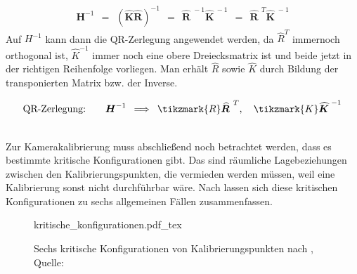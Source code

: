 \begin{align*}
	\boldsymbol{H}^{-1}
	{\:\:}={\:\:}
	(\boldsymbol{\widehat{K}}\boldsymbol{\widehat{R}})^{-1}
	{\:\:}={\:\:}
	\boldsymbol{\widehat{R}}^{\mspace{6mu}-1}\boldsymbol{\widehat{K}}^{\mspace{4mu}-1}
	{\:\:}={\:\:}
	\boldsymbol{\widehat{R}}^{\mspace{8mu}T} \boldsymbol{\widehat{K}}^{\mspace{5mu}-1}
\end{align*}
Auf $H^{-1}$ kann dann die QR-Zerlegung angewendet werden, da $\widehat{R}^T$ immernoch orthogonal ist, $\widehat{K}^{-1}$ immer noch eine obere Dreiecksmatrix ist und beide jetzt in der richtigen Reihenfolge vorliegen. Man erhält $\widehat{R}$ sowie $\widehat{K}$ durch Bildung der transponierten Matrix bzw. der Inverse.
\begin{samepage} %
\begin{align*}
	\text{QR-Zerlegung:}\qquad \boldsymbol{H}^{-1} \:\implies\: \tikzmark{R}\boldsymbol{\widehat{R}}^{\mspace{8mu}T},\quad \tikzmark{K}\boldsymbol{\widehat{K}}^{\mspace{5mu}-1}
\end{align*}
\end{samepage}\\[1.7cm]

Zur Kamerakalibrierung muss abschließend noch betrachtet werden, dass es bestimmte kritische Konfigurationen gibt. Das sind räumliche Lagebeziehungen zwischen den Kalibrierungspunkten, die vermieden werden müssen, weil eine Kalibrierung sonst nicht durchführbar wäre. Nach \cite[S. 537]{hartley_zisserman} lassen sich diese kritischen Konfigurationen zu sechs allgemeinen Fällen zusammenfassen.
\begin{figure}[H]
	\centering
	\def\svgwidth{10cm}
	{kritische_konfigurationen.pdf_tex}
	\caption[Sechs kritische Konfigurationen von Kalibrierungspunkten]{Sechs kritische Konfigurationen von Kalibrierungspunkten nach \cite[S. 537]{hartley_zisserman}, Quelle: \cite[S. 538]{hartley_zisserman}}
	\label{fig:kritische_konfigurationen}
\end{figure}

